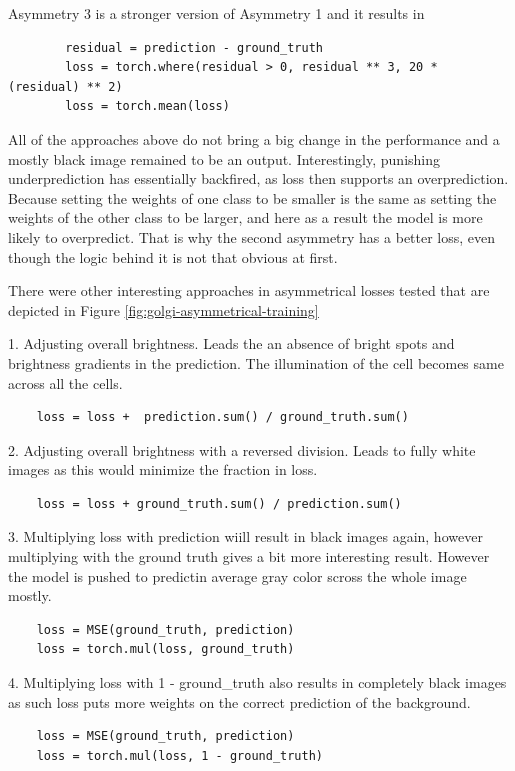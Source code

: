 Asymmetry 3 is a stronger version of Asymmetry 1 and it results in
	\begin{lstlisting}
		residual = prediction - ground_truth
		loss = torch.where(residual > 0, residual ** 3, 20 * (residual) ** 2)
		loss = torch.mean(loss)
	  \end{lstlisting}

All of the approaches above do not bring a big change in the performance and a mostly black image remained to be an output. Interestingly, punishing underprediction has essentially backfired, as loss then supports an overprediction. Because setting the weights of one class to be smaller is the same as setting the weights of the other class to be larger, and here as a result the model is more likely to overpredict. That is why the second asymmetry has a better loss, even though the logic behind it is not that obvious at first.

There were other interesting approaches in asymmetrical losses tested that are depicted in Figure \ref{fig:golgi-asymmetrical-training}

1. Adjusting overall brightness. Leads the an absence of bright spots and brightness gradients in the prediction. The illumination of the cell becomes same across all the cells.
\begin{lstlisting}
	loss = loss +  prediction.sum() / ground_truth.sum()
  \end{lstlisting}

2. Adjusting overall brightness with a reversed division. Leads to fully white images as this would minimize the fraction in loss.
\begin{lstlisting}
	loss = loss + ground_truth.sum() / prediction.sum()
\end{lstlisting}

3. Multiplying loss with prediction wiill result in black images again, however multiplying with the ground truth gives a bit more interesting result. However the model is pushed to predictin average gray color scross the whole image mostly.

\begin{lstlisting}
	loss = MSE(ground_truth, prediction)
	loss = torch.mul(loss, ground_truth)
\end{lstlisting}

4. Multiplying loss with 1 - ground\_truth also results in completely black images as such loss puts more weights on the correct prediction of the background.
\begin{lstlisting}
	loss = MSE(ground_truth, prediction)
	loss = torch.mul(loss, 1 - ground_truth)
\end{lstlisting}

